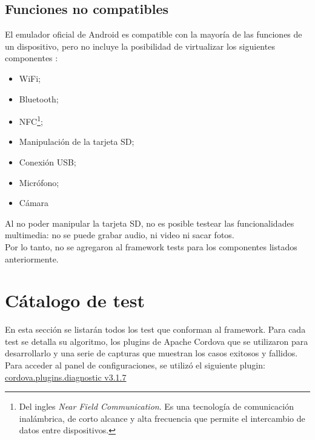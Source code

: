 \subsection{Funciones no compatibles}
El emulador oficial de Android es compatible con la mayoría de las funciones de un dispositivo, pero no incluye la posibilidad de virtualizar los siguientes componentes \cite{daemu}:
\begin{itemize}
    \item WiFi;
    \item Bluetooth;
    \item NFC\footnote{Del ingles \emph{Near Field Communication}. Es una tecnología de comunicación inalámbrica, de corto alcance y alta frecuencia que permite el intercambio de datos entre dispositivos.};
    \item Manipulación de la tarjeta SD;
    \item Conexión USB;
    \item Micrófono;
    \item Cámara
\end{itemize}
Al no poder manipular la tarjeta SD, no es posible testear las funcionalidades multimedia: no se puede grabar audio, ni video ni sacar fotos.\\
Por lo tanto, no se agregaron al framework tests para los componentes listados anteriormente.
\section{Cátalogo de test}
En esta sección se listarán todos los test que conforman al framework. Para cada test se detalla su algoritmo, los plugins de Apache Cordova que se utilizaron para desarrollarlo y una serie de capturas que muestran los casos exitosos y fallidos.\\
Para acceder al panel de configuraciones, se utilizó el siguiente plugin:\\ \href{https://www.npmjs.com/package/cordova.plugins.diagnostic}{cordova.plugins.diagnostic v3.1.7}
